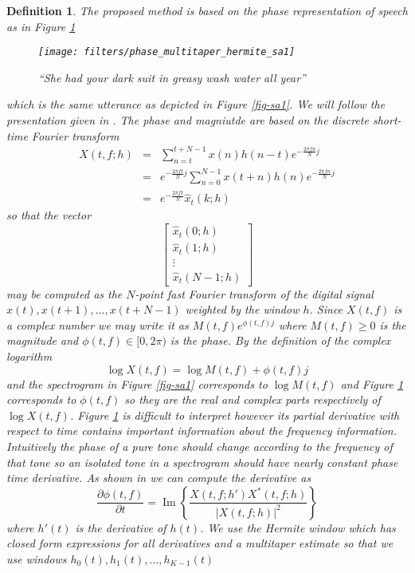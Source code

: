 \documentclass[english]{article}
\newtheorem{defn}{Definition}[section]
\begin{document}
\begin{defn}
The proposed method is based on the phase representation of speech
as in Figure \ref{fig-sa1-phase} 
\begin{figure}
\centering{}\texttt{[image: filters/phase\_multitaper\_hermite\_sa1]}\caption{``She had your dark suit in greasy wash water all year''\label{fig-sa1-phase}}
\end{figure}
which is the same utterance as depicted in Figure \ref{fig-sa1}.
We will follow the presentation given in \cite{fitzfulop2009}. The
phase and magniutde are based on the discrete short-time Fourier transform
\begin{eqnarray*}
X(t,f;h) & = & \sum_{n=t}^{t+N-1}x(n)h(n-t)e^{-\frac{2\pi fn}{N}j}\\
 & = & e^{-\frac{2\pi ft}{N}j}\sum_{n=0}^{N-1}x(t+n)h(n)e^{-\frac{2\pi fn}{N}j}\\
 & = & e^{-\frac{2\pi ft}{N}}\hat{x}_{t}(k;h)
\end{eqnarray*}
so that the vector
\[
\left[\begin{array}{c}
\hat{x}_{t}(0;h)\\
\hat{x}_{t}(1;h)\\
\vdots\\
\hat{x}_{t}(N-1;h)
\end{array}\right]
\]
may be computed as the $N$-point fast Fourier transform of the digital
signal $x(t),x(t+1),\ldots,x(t+N-1)$ weighted by the window $h$.
Since $X(t,f)$ is a complex number we may write it as $M(t,f)e^{\phi(t,f)j}$
where $M(t,f)\geq0$ is the magnitude and $\phi(t,f)\in[0,2\pi)$
is the phase. By the definition of the complex logarithm
\[
\log X(t,f)=\log M(t,f)+\phi(t,f)j
\]
and the spectrogram in Figure \ref{fig-sa1} corresponds to $\log M(t,f)$
and Figure \ref{fig-sa1-phase} corresponds to $\phi(t,f)$ so they
are the real and complex parts respectively of $\log X(t,f)$. Figure
\ref{fig-sa1-phase} is difficult to interpret however its partial
derivative with respect to time contains important information about
the frequency information. Intuitively the phase of a pure tone should
change according to the frequency of that tone so an isolated tone
in a spectrogram should have nearly constant phase time derivative.
As shown in \cite{fitzfulop2009} we can compute the derivative as
\[
\frac{\partial\phi(t,f)}{\partial t}=\operatorname{Im}\left\{ \frac{X(t,f;h')X^{*}(t,f;h)}{|X(t,f;h)|^{2}}\right\} 
\]
where $h'(t)$ is the derivative of $h(t)$. We use the Hermite window
which has closed form expressions for all derivatives \cite{xiaoflandrin}
and a multitaper estimate so that we use windows $h_{0}(t),h_{1}(t),\ldots,h_{K-1}(t)$

\end{defn}
\end{document}
